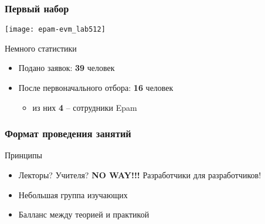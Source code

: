 \begin{frame}
	\frametitle{Первый набор}

	\center\texttt{[image: epam-evm\_lab512]}

	\begin{block}{Немного статистики}
		\begin{itemize}
			\item Подано заявок: {\bf 39} человек
			\item После первоначального отбора: {\bf 16} человек
				\begin{itemize}
					\item из них {\bf 4} -- сотрудники Epam
				\end{itemize}
		\end{itemize}
	\end{block}
\end{frame}

\begin{frame}
	\frametitle{Формат проведения занятий}

	\begin{block}{Принципы}
		\begin{itemize}
			\item Лекторы? Учителя? {\bf NO WAY!!!} \newline 
				Разработчики для разработчиков! 
			\item Небольшая группа изучающих
			\item Балланс между теорией и практикой
		\end{itemize}
	\end{block}

	\pause


\end{frame}



